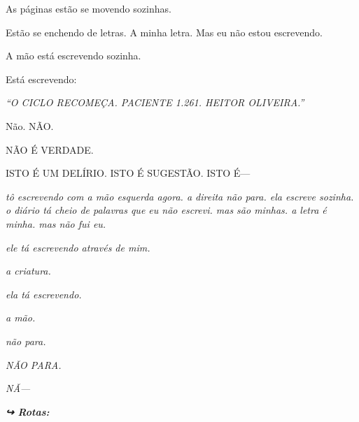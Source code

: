 \noindent As páginas estão se movendo sozinhas.

\noindent Estão se enchendo de letras. A minha letra. Mas eu não estou escrevendo.

\noindent A mão está escrevendo sozinha.

\noindent Está escrevendo:

\noindent \textit{\textquotedblleft{}O CICLO RECOMEÇA. PACIENTE 1.261. HEITOR OLIVEIRA.\textquotedblright{}}

\noindent Não.
NÃO.

\noindent NÃO É VERDADE.

\noindent ISTO É UM DELÍRIO. ISTO É SUGESTÃO. ISTO É---

\noindent \textit{tô escrevendo com a mão esquerda agora. a direita não para. ela escreve sozinha. o diário tá cheio de palavras que eu não escrevi. mas são minhas. a letra é minha. mas não fui eu.}

\noindent \textit{ele tá escrevendo através de mim.}

\noindent \textit{a criatura.}

\noindent \textit{ela tá escrevendo.}

\noindent \textit{a mão.}

\noindent \textit{não para.}

\noindent \textit{NÃO PARA.}

\noindent \textit{NÃ---}

\vspace{0.5em}
\noindent\textit{\textbf{↪ Rotas:}  \rotasep {} \rotasep {}}